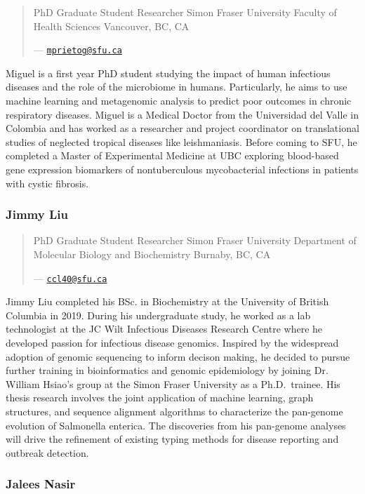 \documentclass[
]{book}
\begin{document}
\begin{quote}
PhD Graduate Student Researcher
Simon Fraser University
Faculty of Health Sciences
Vancouver, BC, CA

--- \href{mailto:mprietog@sfu.ca}{\nolinkurl{mprietog@sfu.ca}}
\end{quote}

Miguel is a first year PhD student studying the impact of human infectious diseases and the role
of the microbiome in humans. Particularly, he aims to use machine learning and metagenomic
analysis to predict poor outcomes in chronic respiratory diseases. Miguel is a Medical Doctor
from the Universidad del Valle in Colombia and has worked as a researcher and project
coordinator on translational studies of neglected tropical diseases like leishmaniasis. Before
coming to SFU, he completed a Master of Experimental Medicine at UBC exploring blood-based
gene expression biomarkers of nontuberculous mycobacterial infections in patients with cystic
fibrosis.

\subsubsection{Jimmy Liu}\label{jimmy-liu}

\begin{quote}
PhD Graduate Student Researcher
Simon Fraser University
Department of Molecular Biology and Biochemistry
Burnaby, BC, CA

--- \href{mailto:ccl40@sfu.ca}{\nolinkurl{ccl40@sfu.ca}}
\end{quote}

Jimmy Liu completed his BSc. in Biochemistry at the University of British Columbia in 2019.
During his undergraduate study, he worked as a lab technologist at the JC Wilt Infectious
Diseases Research Centre where he developed passion for infectious disease genomics.
Inspired by the widespread adoption of genomic sequencing to inform decison making, he
decided to pursue further training in bioinformatics and genomic epidemiology by joining Dr.
William Hsiao's group at the Simon Fraser University as a Ph.D.~trainee. His thesis research
involves the joint application of machine learning, graph structures, and sequence alignment
algorithms to characterize the pan-genome evolution of Salmonella enterica. The discoveries
from his pan-genome analyses will drive the refinement of existing typing methods for disease
reporting and outbreak detection.

\subsubsection{Jalees Nasir}\label{jalees-nasir}
\end{document}
